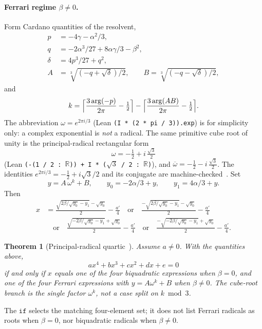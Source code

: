 \documentclass[11pt,a4paper]{article}
\newtheorem{theorem}{Theorem}[section]
\newcommand{\Arg}{\operatorname{arg}}
\begin{document}
\paragraph{Ferrari regime \(\beta\neq 0\).}
Form Cardano quantities of the resolvent,
\begin{align*}
p&=-4\gamma-\alpha^2/3,\\
q&=-2\alpha^3/27+8\alpha\gamma/3-\beta^2,\\
\delta&=4p^3/27+q^2,\\
A&=\sqrt[3]{(-q+\sqrt{\delta})/2},\qquad
B=\sqrt[3]{(-q-\sqrt{\delta})/2},
\end{align*}
and
\[
k=\Bigl\lceil\frac{3\Arg(-p)}{2\pi}-\tfrac12\Bigr\rceil
-\Bigl\lceil\frac{3\Arg(AB)}{2\pi}-\tfrac12\Bigr\rceil.
\]
The abbreviation \(\omega=e^{2\pi i/3}\) (Lean \nolinkurl{(I * (2 * pi / 3)).exp}) is for simplicity only: a complex exponential is \emph{not} a radical.
The same primitive cube root of unity is the principal-radical rectangular form
\[
\omega=-\tfrac12+i\,\tfrac{\sqrt{3}}{2}
\]
(Lean \texttt{(-(1 / 2 : $\mathbb{R}$)) + I * ($\sqrt{3}$ / 2 : $\mathbb{R}$)}), and \(\overline{\omega}=-\tfrac12-i\,\tfrac{\sqrt{3}}{2}\).
The identities \(e^{2\pi i/3}=-\tfrac12+i\sqrt{3}/2\) and its conjugate are machine-checked~\cite{lemma_omega_rect,lemma_omega_conj}.
Set
\[
y=A\,\omega^{k}+B,\qquad
y_0=-2\alpha/3+y,\qquad
y_1=4\alpha/3+y.
\]
Then
\begin{align*}
x&=\frac{\sqrt{2\beta/\sqrt{y_0}-y_1}-\sqrt{y_0}}{2}-\frac{a'}{4}
\quad\text{or}\quad
\frac{-\sqrt{2\beta/\sqrt{y_0}-y_1}-\sqrt{y_0}}{2}-\frac{a'}{4}\\
&\quad\text{or}\quad
\frac{\sqrt{-2\beta/\sqrt{y_0}-y_1}+\sqrt{y_0}}{2}-\frac{a'}{4}
\quad\text{or}\quad
\frac{-\sqrt{-2\beta/\sqrt{y_0}-y_1}+\sqrt{y_0}}{2}-\frac{a'}{4}.
\end{align*}

\begin{theorem}[Principal-radical quartic~\cite{lemma_quartic_lean}]
\label{thm:quartic}
Assume \(a\neq 0\).
With the quantities above,
\[
ax^4+bx^3+cx^2+dx+e=0
\]
if and only if \(x\) equals one of the four biquadratic expressions when \(\beta=0\), and one of the four Ferrari expressions with \(y=A\omega^{k}+B\) when \(\beta\neq 0\).
The cube-root branch is the single factor \(\omega^{k}\), not a case split on \(k\bmod 3\).
\end{theorem}

The \(\mathtt{if}\) selects the matching four-element set; it does not list Ferrari radicals as roots when \(\beta=0\), nor biquadratic radicals when \(\beta\neq 0\).
\end{document}
